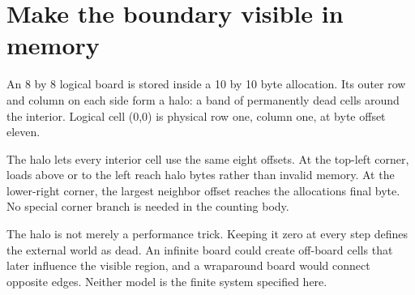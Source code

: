 \section{Make the boundary visible in
  memory}\label{008-life-generations-p02-make-the-boundary-visible-in-memory}

An 8 by 8 logical board is stored inside a 10 by 10 byte allocation. Its
outer row and column on each side form a halo: a band of permanently
dead cells around the interior. Logical cell (0,0) is physical row one,
column one, at byte offset eleven.

The halo lets every interior cell use the same eight offsets. At the
top-left corner, loads above or to the left reach halo bytes rather than
invalid memory. At the lower-right corner, the largest neighbor offset
reaches the allocation\textquotesingle s final byte. No special corner
branch is needed in the counting body.

The halo is not merely a performance trick. Keeping it zero at every
step defines the external world as dead. An infinite board could create
off-board cells that later influence the visible region, and a
wraparound board would connect opposite edges. Neither model is the
finite system specified here.
